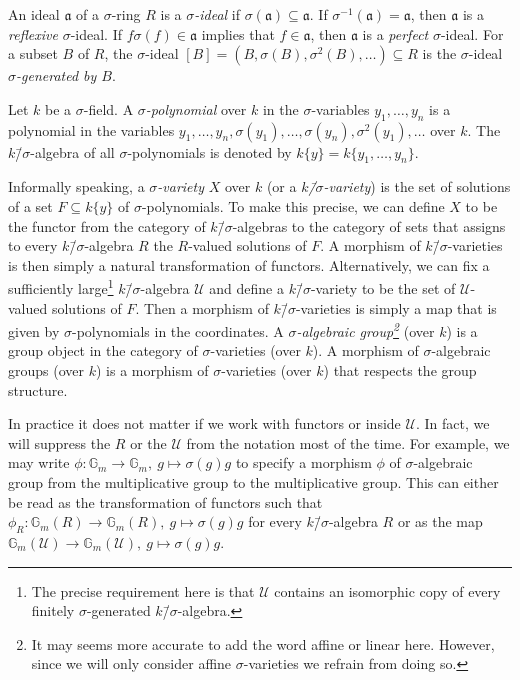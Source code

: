 \documentclass[oneside,reqno]{amsart}
\theoremstyle{definition}
\newcommand{\f}{\phi}
\newcommand{\ida}{\mathfrak{a}}
\newcommand{\s}{\sigma}
\newcommand{\ks}{$k$\=/$\s$}
\newcommand{\Gm}{\mathbb{G}_m}
\begin{document}
An ideal $\ida$ of a $\s$-ring $R$ is a \emph{$\s$-ideal} if $\s(\ida)\subseteq\ida$. If $\s^{-1}(\ida)=\ida$, then $\ida$ is a \emph{reflexive} $\s$-ideal. If $f\s(f)\in\ida$ implies that $f\in\ida$, then $\ida$ is a \emph{perfect} $\s$-ideal. For a subset $B$ of $R$, the $\s$-ideal $[B]=(B,\s(B),\s^2(B),\ldots)\subseteq R$ is the $\s$-ideal \emph{$\s$-generated by $B$}.

Let $k$ be a $\s$-field. A \emph{$\s$-polynomial} over $k$ in the $\s$-variables $y_1,\ldots,y_n$ is a polynomial in the variables $y_1,\ldots,y_n,\s(y_1),\ldots,\s(y_n),\s^2(y_1),\ldots$ over $k$. The \ks-algebra of all $\s$-polynomials is denoted by $k\{y\}=k\{y_1,\ldots,y_n\}$. 


Informally speaking, a \emph{$\s$-variety} $X$ over $k$ (or a \emph{\ks-variety}) is the set of solutions of a set $F\subseteq k\{y\}$ of $\s$-polynomials. To make this precise, we can define $X$ to be the functor from the category of \ks-algebras to the category of sets that assigns to every \ks-algebra $R$ the $R$-valued solutions of $F$. A morphism of \ks-varieties is then simply a natural transformation of functors. Alternatively, we can fix a sufficiently large\footnote{The precise requirement here is that $\mathcal{U}$ contains an isomorphic copy of every finitely $\s$-generated \ks-algebra.} \ks-algebra $\mathcal{U}$ and define a \ks-variety to be the set of $\mathcal{U}$-valued solutions of $F$. Then a morphism of \ks-varieties is simply a map that is given by $\s$-polynomials in the coordinates. A \emph{$\s$-algebraic group\footnote{It may seems more accurate to add the word affine or linear here. However, since we will only consider affine $\s$-varieties we refrain from doing so.}} (over $k$) is a group object in the category of $\s$-varieties (over $k$). A morphism of $\s$-algebraic groups (over $k$) is a morphism of $\s$-varieties (over $k$) that respects the group structure.


In practice it does not matter if we work with functors or inside $\mathcal{U}$. In fact, we will suppress the $R$ or the $\mathcal{U}$ from the notation most of the time. For example,
we may write $\f\colon \Gm\to \Gm,\ g\mapsto\s(g)g$ to specify a morphism $\f$ of $\s$-algebraic group from the multiplicative group to the multiplicative group. This can either be read as the transformation of functors such that $\f_R\colon \Gm(R)\to\Gm(R),\ g\mapsto\s(g)g$ for every \ks-algebra $R$ or as the map $\Gm(\mathcal{U})\to\Gm(\mathcal{U}),\ g\mapsto\s(g)g$.
\end{document}
